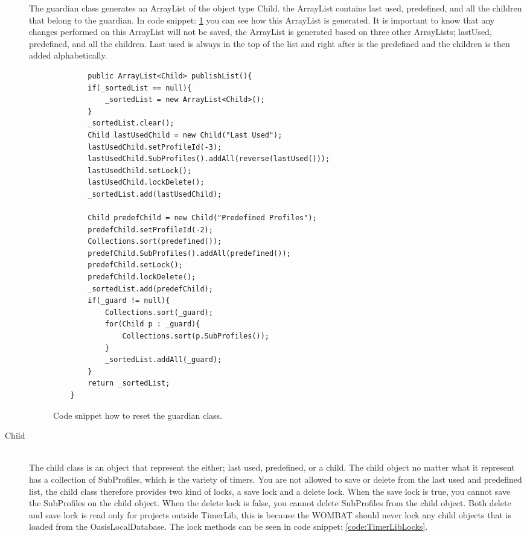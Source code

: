 \begin{description}
The guardian class generates an ArrayList of the object type Child. the ArrayList contains last used, predefined, and all the children that belong to the guardian. In code snippet: \ref{code:publishList} you can see how this ArrayList is generated. It is important to know that any changes performed on this ArrayList will not be saved, the ArrayList is generated based on three other ArrayLists; lastUsed, predefined, and all the children. Last used is always in the top of the list and right after is the predefined and the children is then added alphabetically.
	
		\begin{figure}[H]
\begin{lstlisting}
		public ArrayList<Child> publishList(){
		if(_sortedList == null){
			_sortedList = new ArrayList<Child>();
		}
		_sortedList.clear();
		Child lastUsedChild = new Child("Last Used");
		lastUsedChild.setProfileId(-3);
		lastUsedChild.SubProfiles().addAll(reverse(lastUsed()));
		lastUsedChild.setLock();
		lastUsedChild.lockDelete();
		_sortedList.add(lastUsedChild);
		
		Child predefChild = new Child("Predefined Profiles");
		predefChild.setProfileId(-2);
		Collections.sort(predefined());
		predefChild.SubProfiles().addAll(predefined());
		predefChild.setLock();
		predefChild.lockDelete();
		_sortedList.add(predefChild);
		if(_guard != null){
			Collections.sort(_guard);
			for(Child p : _guard){
				Collections.sort(p.SubProfiles());
			}
			_sortedList.addAll(_guard);
		}
		return _sortedList;
	}
\end{lstlisting}
\caption{Code snippet how to reset the guardian class.}%
\label{code:publishList}%
\end{figure}
	
  \item[Child] \hfill \\
The child class is an object that represent the either; last used, predefined, or a child. The child object no matter what it represent has a collection of SubProfiles, which is the variety of timers. You are not allowed to save or delete from the last used and predefined list, the child class therefore provides two kind of locks, a save lock and a delete lock. When the save lock is true, you cannot save the SubProfiles on the child object. When the delete lock is false, you cannot delete SubProfiles from the child object. Both delete and save lock is read only for projects outside TimerLib, this is because the WOMBAT should never lock any child objects that is loaded from the OasisLocalDatabase. The lock methods can be seen in code snippet: \ref{code:TimerLibLocks}.


\end{description}
